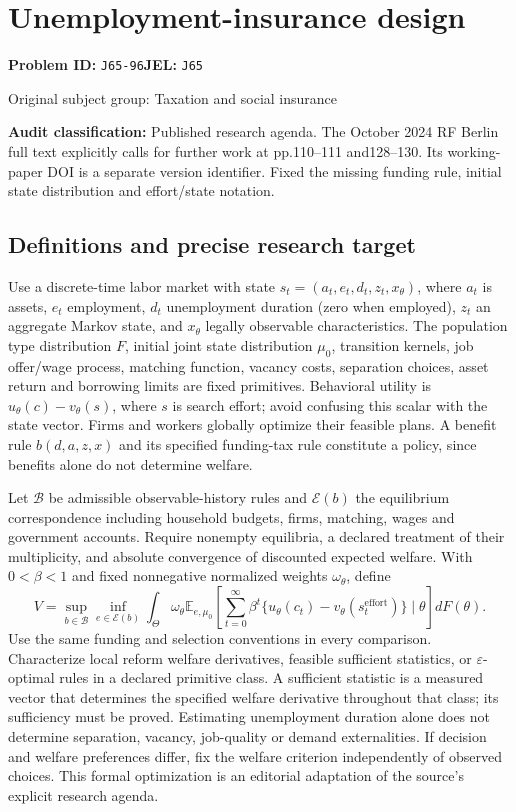 \documentclass[11pt,a4paper]{article}
\begin{document}
\section*{Unemployment-insurance design}
\textbf{Problem ID:} \texttt{J65-96}\quad \textbf{JEL:} \texttt{J65}\par
\label{problem:OP-0478}
{\sffamily\small\color{muted}Original subject group: Taxation and social insurance\par}
\label{definitions:problem:30007760}
\textbf{Audit classification:} Published research agenda. The October 2024 RF Berlin full text explicitly calls for further work at pp.110–111 and128–130. Its working-paper DOI is a separate version identifier. Fixed the missing funding rule, initial state distribution and effort/state notation.
\subsection*{Definitions and precise research target}
Use a discrete-time labor market with state \(s_t=(a_t,e_t,d_t,z_t,x_\theta)\), where \(a_t\) is assets, \(e_t\) employment, \(d_t\) unemployment duration (zero when employed), \(z_t\) an aggregate Markov state, and \(x_\theta\) legally observable characteristics. The population type distribution \(F\), initial joint state distribution \(\mu_0\), transition kernels, job offer/wage process, matching function, vacancy costs, separation choices, asset return and borrowing limits are fixed primitives. Behavioral utility is \(u_\theta(c)-v_\theta(s)\), where \(s\) is search effort; avoid confusing this scalar with the state vector. Firms and workers globally optimize their feasible plans. A benefit rule \(b(d,a,z,x)\) and its specified funding-tax rule constitute a policy, since benefits alone do not determine welfare.

Let \(\mathcal B\) be admissible observable-history rules and \(\mathcal E(b)\) the equilibrium correspondence including household budgets, firms, matching, wages and government accounts. Require nonempty equilibria, a declared treatment of their multiplicity, and absolute convergence of discounted expected welfare. With \(0<\beta<1\) and fixed nonnegative normalized weights \(\omega_\theta\), define
\[
 V=\sup_{b\in\mathcal B}\inf_{e\in\mathcal E(b)}
 \int_\Theta\omega_\theta\mathbb E_{e,\mu_0}\!
 \left[\sum_{t=0}^\infty\beta^t
 \{u_\theta(c_t)-v_\theta(s_t^{\mathrm{effort}})\}\mid\theta\right]dF(\theta).
\]
Use the same funding and selection conventions in every comparison. Characterize local reform welfare derivatives, feasible sufficient statistics, or \(\varepsilon\)-optimal rules in a declared primitive class. A sufficient statistic is a measured vector that determines the specified welfare derivative throughout that class; its sufficiency must be proved. Estimating unemployment duration alone does not determine separation, vacancy, job-quality or demand externalities. If decision and welfare preferences differ, fix the welfare criterion independently of observed choices. This formal optimization is an editorial adaptation of the source's explicit research agenda.
\end{document}

